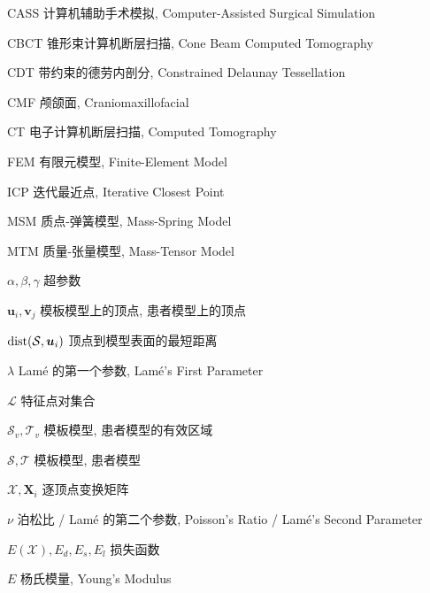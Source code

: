 
\begin{denotation}[3cm]
  \item[CASS] 计算机辅助手术模拟, Computer-Assisted Surgical Simulation
  \item[CBCT] 锥形束计算机断层扫描, Cone Beam Computed Tomography
  \item[CDT] 带约束的德劳内剖分, Constrained Delaunay Tessellation
  \item[CMF] 颅颌面, Craniomaxillofacial
  \item[CT] 电子计算机断层扫描, Computed Tomography
  \item[FEM] 有限元模型, Finite-Element Model
  \item[ICP] 迭代最近点, Iterative Closest Point
  \item[MSM] 质点-弹簧模型, Mass-Spring Model
  \item[MTM] 质量-张量模型, Mass-Tensor Model
  \item[$\alpha, \beta, \gamma$] 超参数
  \item[$\bm{u}_i, \bm{v}_j$] 模板模型上的顶点, 患者模型上的顶点
  \item[$\operatorname{dist}(\mathcal{S}, \bm{u}_i)$] 顶点到模型表面的最短距离
  \item[$\lambda$] Lam\'e 的第一个参数, Lam\'e's First Parameter
  \item[$\mathcal{L}$] 特征点对集合
  \item[$\mathcal{S}_v, \mathcal{T}_v$] 模板模型, 患者模型的有效区域
  \item[$\mathcal{S}, \mathcal{T}$] 模板模型, 患者模型
  \item[$\mathcal{X}, \bm{X}_i$] 逐顶点变换矩阵
  \item[$\nu$] 泊松比 / Lam\'e 的第二个参数, Poisson's Ratio / Lam\'e's Second Parameter
  \item[$E(\mathcal{X}), E_d, E_s, E_l$] 损失函数
  \item[$E$] 杨氏模量, Young's Modulus
\end{denotation}
